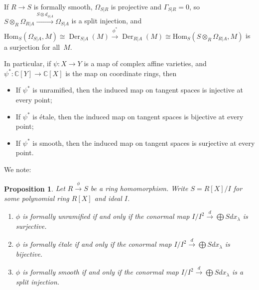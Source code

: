 \documentclass{amsart}[12pt]
\def\Der{\operatorname{Der}}
\newcommand{\Hom}{\mathrm{Hom}}
\newcommand{\C}{\mathbb{C}}
\numberwithin{equation}{section}
\theoremstyle{plain} %
\newtheorem{prop}[equation]{Proposition}
\theoremstyle{definition}
\theoremstyle{remark}
\newcommand{\xra}[1]{\xrightarrow{#1}}
\begin{document}
If $R\to S$ is {formally smooth}, $\Omega_{S|R}$ is projective and $\Gamma_{S|R}=0$, so $S\otimes_R \Omega_{R|A} \xra{S\otimes d_{\phi|A}} \Omega_{S|A}$ is a split injection, and $\Hom_{S}(\Omega_{S|A},M)\cong \Der_{S|A}(M) \xra{\phi^*} \Der_{R|A}(M)\cong \Hom_S(S\otimes_R \Omega_{R|A},M)$ is a surjection for all~$M$.

In particular, if $\psi:X\to Y$ is a map of complex affine varieties, and $\psi^*:\C[Y] \to \C[X]$ is the map on coordinate rings, then
\begin{itemize}
\item If $\psi^*$ is unramified, then the induced map on tangent spaces is injective at every point;
\item If $\psi^*$ is \'etale, then the induced map on tangent spaces is bijective at every point;
\item If $\psi^*$ is smooth, then the induced map on tangent spaces is surjective at every point.
\end{itemize}


We note:
\begin{prop} Let $R\xra{\phi} S$ be a ring homomorphism. Write $S=R[X]/I$ for some polynomial ring $R[X]$ and ideal $I$.
\begin{enumerate}
\item $\phi$ is formally unramified if and only if the conormal map $I/I^2 \xra{d} \bigoplus S dx_\lambda$ is surjective.
\item $\phi$ is formally \'etale if and only if the conormal map $I/I^2 \xra{d} \bigoplus S dx_\lambda$ is bijective.
\item $\phi$ is formally smooth if and only if the conormal map $I/I^2 \xra{d} \bigoplus S dx_\lambda$ is a split injection.
\end{enumerate}
\end{prop}
\end{document}
